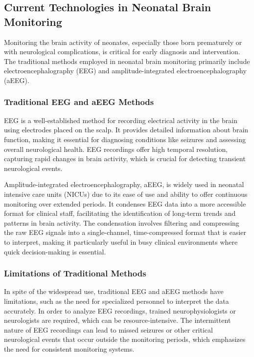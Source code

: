 \documentclass[12pt,journal,compsoc]{IEEEtran}
\begin{document}
\subsection{Current Technologies in Neonatal Brain Monitoring}

Monitoring the brain activity of neonates, especially those born prematurely or with neurological complications, is critical for early diagnosis and intervention. The traditional methods employed in neonatal brain monitoring primarily include electroencephalography (EEG) and amplitude-integrated electroencephalography (aEEG).

\subsubsection{Traditional EEG and aEEG Methods}

EEG is a well-established method for recording electrical activity in the brain using electrodes placed on the scalp. It provides detailed information about brain function, making it essential for diagnosing conditions like seizures and assessing overall neurological health. EEG recordings offer high temporal resolution, capturing rapid changes in brain activity, which is crucial for detecting transient neurological events.

Amplitude-integrated electroencephalography, aEEG, is widely used in neonatal intensive care units (NICUs) due to its ease of use and ability to offer continuous monitoring over extended periods. It condenses EEG data into a more accessible format for clinical staff, facilitating the identification of long-term trends and patterns in brain activity. The condensation involves filtering and compressing the raw EEG signals into a single-channel, time-compressed format that is easier to interpret, making it particularly useful in busy clinical environments where quick decision-making is essential.

\subsubsection{Limitations of Traditional Methods}

In spite of the widespread use, traditional EEG and aEEG methods have  limitations, such as the need for specialized personnel to interpret the data accurately. In order to analyze EEG recordings, trained neurophysiologists or neurologists are required, which can be resource-intensive. The intermittent nature of EEG recordings can lead to missed seizures or other critical neurological events that occur outside the monitoring periods, which emphasizes the need for consistent monitoring systems. 
\end{document}
